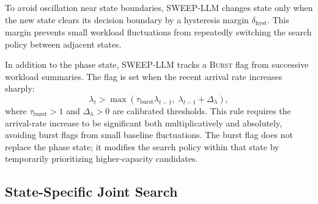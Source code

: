 To avoid oscillation near state boundaries, SWEEP-LLM changes state only when the new state clears its decision boundary by a hysteresis margin $\delta_{\mathrm{hyst}}$.
This margin prevents small workload fluctuations from repeatedly switching the search policy between adjacent states.

In addition to the phase state, SWEEP-LLM tracks a \textsc{Burst} flag from successive workload summaries.
The flag is set when the recent arrival rate increases sharply:
\begin{equation}
\lambda_t > \max(\tau_{\mathrm{burst}}\lambda_{t-1},\; \lambda_{t-1} + \Delta_{\lambda}),
\end{equation}
where $\tau_{\mathrm{burst}}>1$ and $\Delta_{\lambda}>0$ are calibrated thresholds.
This rule requires the arrival-rate increase to be significant both multiplicatively and absolutely, avoiding burst flags from small baseline fluctuations.
The burst flag does not replace the phase state; it modifies the search policy within that state by temporarily prioritizing higher-capacity candidates.

\iffalse
\subsection{State-Specific Joint Search}
\label{sec:joint_search}

